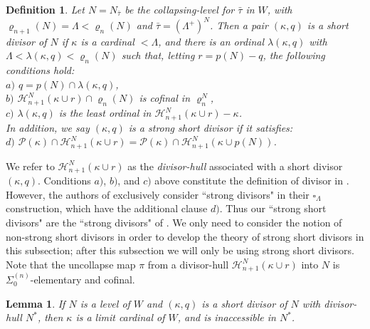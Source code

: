 \documentclass[12pt]{article}
\newtheorem{lem}[thm]{Lemma}
\newtheorem{defn}[thm]{Definition}
\begin{document}
\begin{defn} \label{short divisor}
Let $N = N_{\bar{\tau}}$ be the collapsing-level for $\bar{\tau}$ in $W$, with $\varrho_{n+1}(N) = \Lambda < \varrho_n (N)$ and $\bar{\tau} = (\Lambda^+ )^N$.  Then a pair $( \kappa , q )$ is a \textit{short divisor} of $N$ if $\kappa$ is a cardinal $< \Lambda$, and there is an ordinal $\lambda (\kappa , q) $ with $\Lambda < \lambda (\kappa , q) < \varrho_n(N)$ such that, letting $r = p (N) - q$, the following conditions hold:\\


\indent \indent $a)$ $q = p(N) \cap \lambda (\kappa , q)$,\\

\indent \indent $b)$ $\mathcal{H}_{n+1}^N ( \kappa \cup r ) \cap \varrho_n (N)$ is cofinal in $\varrho_n^N$,\\

\indent \indent $c)$ $\lambda ( \kappa , q) $ is the least ordinal in $\mathcal{H}_{n+1}^N ( \kappa \cup r ) - \kappa$.\\

In addition, we say $(\kappa , q)$ is a strong short divisor if it satisfies:\\

\indent \indent $d)$ $\mathcal{P} (\kappa ) \cap \mathcal{H}_{n+1}^N ( \kappa \cup r ) = \mathcal{P} (\kappa ) \cap \mathcal{H}_{n+1}^N ( \kappa \cup p(N) )$.
\end{defn}


We refer to $\mathcal{H}_{n+1}^N ( \kappa \cup r )$ as the \textit{divisor-hull} associated with a short divisor $(\kappa, q)$.  Conditions $a)$, $b)$, and $c)$ above constitute the definition of divisor in \cite{zeman square proof}.  However, the authors of \cite{zeman square proof} exclusively consider ``strong divisors" in their $\square_\Lambda$ construction, which have the additional clause $d)$.  Thus our ``strong short divisors" are the ``strong divisors" of \cite{zeman square proof}.  We only need to consider the notion of non-strong short divisors in order to develop the theory of strong short divisors in this subsection; after this subsection we will only be using strong short divisors.\\

Note that the uncollapse map $\pi$ from a divisor-hull $\mathcal{H}_{n+1}^N ( \kappa \cup r )$ into $N$ is $\Sigma_0^{(n)}$-elementary and cofinal.\\

\begin{lem}
If $N$ is a level of $W$ and $(\kappa , q)$ is a short divisor of $N$ with divisor-hull $N^*$, then $\kappa$ is a limit cardinal of $W$, and is inaccessible in $N^*$.
\end{lem}
\end{document}
